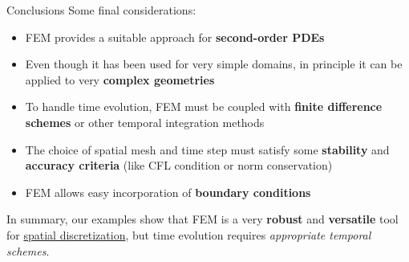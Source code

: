 \begin{frame}{Conclusions}
    Some final considerations:

    \vfill

    \pause

    \begin{itemize}
        \item FEM provides a suitable approach for \textbf{second-order PDEs}
        \pause
        \item Even though it has been used for very simple domains, in principle it can be applied to very \textbf{complex geometries}
        \pause
        \item To handle time evolution, FEM must be coupled with \textbf{finite difference schemes} or other temporal integration methods
        \pause
        \item The choice of spatial mesh and time step must satisfy some \textbf{stability} and \textbf{accuracy criteria} (like CFL condition or norm conservation)
        \pause
        \item FEM allows easy incorporation of \textbf{boundary conditions}
    \end{itemize}

    \vfill

    \pause

    In summary, our examples show that FEM is a very \textbf{robust} and \textbf{versatile} tool for \underline{spatial discretization}, but time evolution requires \textit{appropriate temporal schemes}.
\end{frame}
